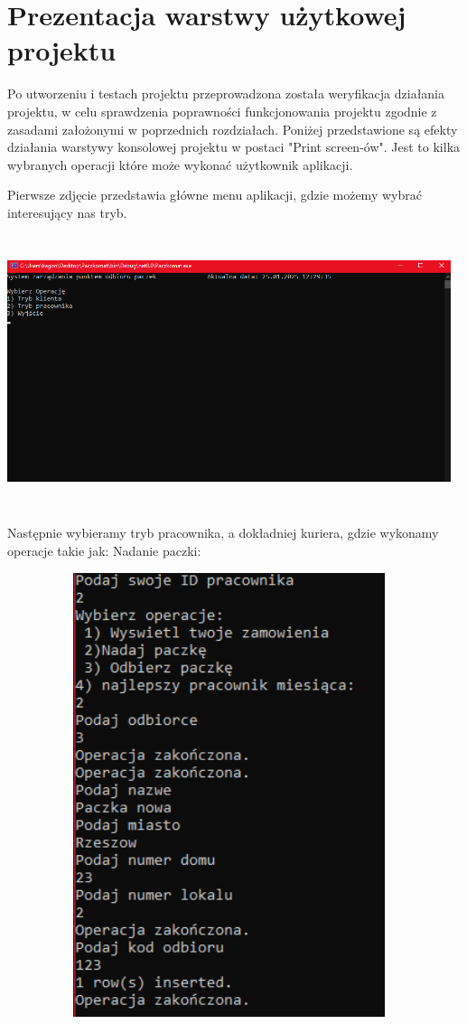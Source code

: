 \chapter{Prezentacja warstwy użytkowej projektu}
Po utworzeniu i testach projektu przeprowadzona została weryfikacja działania projektu, w celu sprawdzenia poprawności funkcjonowania projektu zgodnie z zasadami założonymi w poprzednich rozdziałach. Poniżej przedstawione są efekty działania warstywy konsolowej projektu w postaci "Print screen-ów". Jest to kilka wybranych operacji które może wykonać użytkownik aplikacji.

Pierwsze zdjęcie przedstawia główne menu aplikacji, gdzie możemy wybrać interesujący nas tryb.
\begin{center}
\includegraphics[width=13.0cm, height=8.0cm]{Menu projekt.png}
\end{center}

Następnie wybieramy tryb pracownika, a dokładniej kuriera, gdzie wykonamy operacje takie jak:
Nadanie paczki:
\begin{center}
\includegraphics[width=13.0cm, height=13.0cm]{Nadanie paczki kurier.png}
\end{center}

